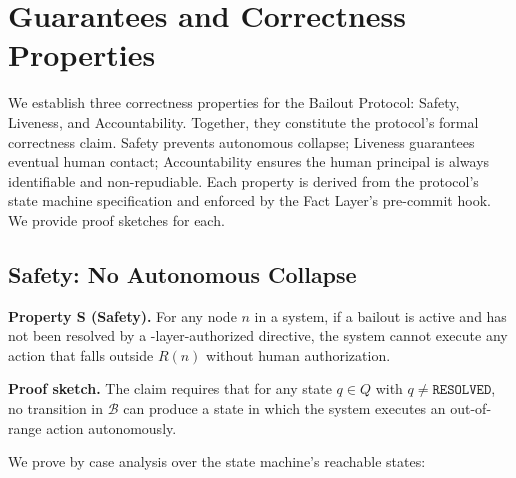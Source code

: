 \section{Guarantees and Correctness Properties}\label{sec:properties}

We establish three correctness properties for the Bailout Protocol: Safety, Liveness, and Accountability. Together, they constitute the protocol's formal correctness claim. Safety prevents autonomous collapse; Liveness guarantees eventual human contact; Accountability ensures the human principal is always identifiable and non-repudiable. Each property is derived from the protocol's state machine specification and enforced by the Fact Layer's pre-commit hook. We provide proof sketches for each.

\subsection{Safety: No Autonomous Collapse}

\textbf{Property S (Safety).} For any node $n$ in a \bxthree{} system, if a bailout is active and has not been resolved by a \purpose-layer-authorized directive, the system cannot execute any action that falls outside $R(n)$ without human authorization.

\medskip
\noindent\textbf{Proof sketch.} The claim requires that for any state $q \in Q$ with $q \neq \texttt{RESOLVED}$, no transition in $\mathcal{B}$ can produce a state in which the system executes an out-of-range action autonomously.

We prove by case analysis over the state machine's reachable states:

